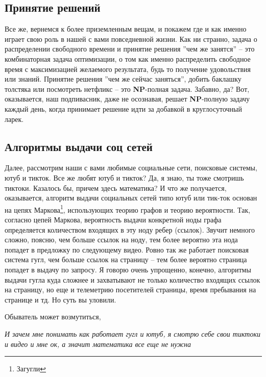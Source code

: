 \subsection{Принятие решений}\label{subsec:decision-making}
Все же, вернемся к более приземленным вещам, и покажем где и как именно играет свою роль в нашей с вами повседневной жизни.
Как ни странно, задача о распределении свободного времени и принятие решения ''чем же занятся'' -- это комбинаторная задача оптимизации,
о том как именно распределить свободное время с максимизацией желаемого результата, будь то получение удовольствия или знаний.
Принятие решения ''чем же сейчас заняться'', добить баклашку толстяка или посмотреть нетфликс -- это \textbf{NP}-полная задача.
Забавно, да?
Вот, оказывается, наш подпивасник, даже не осознавая, решает \textbf{NP}-полную задачу каждый день,
когда принимает решение идти за добавкой в круглосуточный ларек.

\subsection{Алгоритмы выдачи соц сетей}\label{subsec:social-media}

Далее, рассмотрим наши с вами любимые социальные сети, поисковые системы, ютуб и тикток.
Все же любят ютуб и тикток?
Да, я знаю, ты тоже смотришь тиктоки.
Казалось бы, причем здесь математика?
И что же получается, оказывается, алгоритм выдачи социальных сетей типо ютуб или тик-ток основан на цепях Маркова\footnote{Загугли},
использующих теорию графов и теорию вероятности.
Так, согласно цепей Маркова, вероятность выдачи конкретной ноды графа определяется количеством входящих в эту ноду ребер (ссылок).
Звучит немного сложно, поясню, чем больше ссылок на ноду, тем более вероятно эта нода попадет в предложку по следующему видео.
Ровно так же работает поисковая система гугл, чем больше ссылок на страницу -- тем более вероятно страница попадет в выдачу
по запросу.
Я говорю очень упрощенно, конечно, алгоритмы выдачи гугла куда сложнее и захватывают не только количество входящих ссылок на страницу,
но еще и телеметрию посетителей страницы, время пребывания на странице и тд.
Но суть вы уловили.

Обыватель может возмутиться,

\begin{displayquote}
    \textit{
        И зачем мне понимать как работает гугл и ютуб, я смотрю себе свои тиктоки и видео и мне ок, а значит математика все еще не нужна
    }
\end{displayquote}

